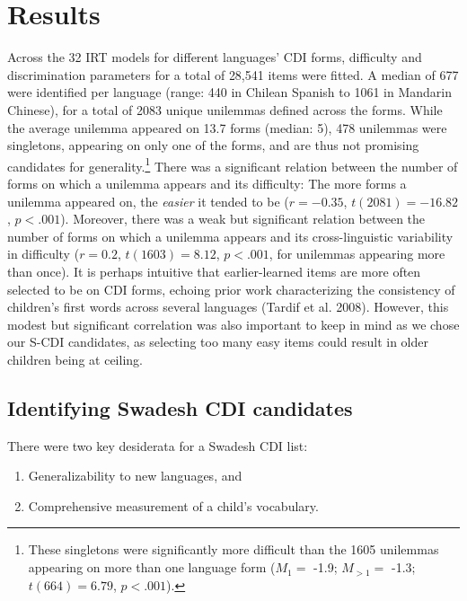 \documentclass[
  letterpaper,
  DIV=11,
  numbers=noendperiod]{scrartcl}
\providecommand{\tightlist}{%
  \setlength{\itemsep}{0pt}\setlength{\parskip}{0pt}}\usepackage{longtable,booktabs,array}
\begin{document}
\section{Results}\label{results}

Across the 32 IRT models for different languages' CDI forms, difficulty
and discrimination parameters for a total of 28,541 items were fitted. A
median of 677 were identified per language (range: 440 in Chilean
Spanish to 1061 in Mandarin Chinese), for a total of 2083 unique
unilemmas defined across the forms. While the average unilemma appeared
on 13.7 forms (median: 5), 478 unilemmas were singletons, appearing on
only one of the forms, and are thus not promising candidates for
generality.\footnote{These singletons were significantly more difficult
  than the 1605 unilemmas appearing on more than one language form
  (\(M_1=\) -1.9; \(M_{>1}=\) -1.3; \(t(664) = 6.79\), \(p < .001\)).}
There was a significant relation between the number of forms on which a
unilemma appears and its difficulty: The more forms a unilemma appeared
on, the \emph{easier} it tended to be (\(r = -0.35\),
\(t(2081) = -16.82\), \(p < .001\)). Moreover, there was a weak but
significant relation between the number of forms on which a unilemma
appears and its cross-linguistic variability in difficulty (\(r = 0.2\),
\(t(1603) = 8.12\), \(p < .001\), for unilemmas appearing more than
once). It is perhaps intuitive that earlier-learned items are more often
selected to be on CDI forms, echoing prior work characterizing the
consistency of children's first words across several languages (Tardif
et al. 2008). However, this modest but significant correlation was also
important to keep in mind as we chose our S-CDI candidates, as selecting
too many easy items could result in older children being at ceiling.

\subsection{Identifying Swadesh CDI
candidates}\label{identifying-swadesh-cdi-candidates}

There were two key desiderata for a Swadesh CDI list:

\begin{enumerate}
\def\labelenumi{\arabic{enumi}.}
\tightlist
\item
  Generalizability to new languages, and
\item
  Comprehensive measurement of a child's vocabulary.
\end{enumerate}
\end{document}
